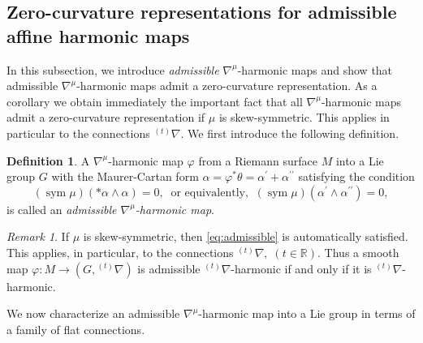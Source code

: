 \documentclass[12pt]{amsart}
\theoremstyle{definition}
\newtheorem{Definition}{Definition}[section]
\theoremstyle{remark}
\newtheorem{Remark}[Theorem]{Remark}
\numberwithin{equation}{section}
\begin{document}
\subsection{Zero-curvature representations for admissible affine harmonic maps}
 In this subsection, we introduce {\it admissible} ${\nabla^{\mu}}$-harmonic 
 maps and show that admissible ${\nabla^{\mu}}$-harmonic maps admit a zero-curvature representation.
 As a corollary we obtain immediately the important fact that all $\nabla^{\mu}$-harmonic 
 maps admit a zero-curvature representation if $\mu$ is skew-symmetric.
 This applies in particular to the connections ${}^{(t)}\nabla$.
 We first introduce the following definition.
\begin{Definition}
 A ${\nabla^{\mu}}$-harmonic map $\varphi$ from a Riemann surface $M$ 
 into a Lie group $G$ with the Maurer-Cartan form $\alpha = \varphi^* \theta =
 \alpha^{\prime} + \alpha^{\prime \prime}$ satisfying the 
 condition 
 \begin{equation}\label{eq:admissible}
 ({\operatorname {sym}} \mu)(*\alpha \wedge \alpha)=0,
\;\;\mbox{or equivalently,} \;\;
 ({\operatorname {sym}} \mu)(\alpha^{\prime} \wedge \alpha^{\prime \prime})=0,
 \end{equation}
 is called an {\it admissible ${\nabla^{\mu}}$-harmonic map}.
\end{Definition}
\begin{Remark}\label{Rm:admissible}
 If $\mu$ is skew-symmetric, then \eqref{eq:admissible} is automatically satisfied. 
 This applies, in particular, to the connections  ${{}^{(t)} \nabla}, \; (t\in \mathbb R)$.
 Thus a smooth map $\varphi : M \to (G, {{}^{(t)} \nabla})$ is admissible ${{}^{(t)} \nabla}$-harmonic if and 
 only if it is ${{}^{(t)} \nabla}$-harmonic.
\end{Remark}
 We now characterize an admissible ${\nabla^{\mu}}$-harmonic map into a Lie group 
 in terms of a family of flat connections.
\end{document}
